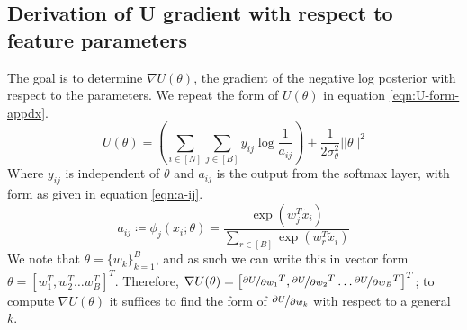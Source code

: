 \subsection{Derivation of U gradient with respect to feature parameters}
\label{appdx:gradu}
The goal is to determine $\nabla U(\theta)$, the gradient of the negative log posterior with respect to the parameters. We repeat the form of $U(\theta)$ in equation \ref{eqn:U-form-appdx}.
%
\begin{equation}
	U(\theta) = \left( \sum_{i \in [N]} \sum_{j \in [B]} y_{ij} \log \frac{1}{a_{ij}} \right)
	+ \frac{1}{2\sigma_\theta^2} ||\theta||^2
	\label{eqn:U-form-appdx}
\end{equation}
%
Where $y_{ij}$ is independent of $\theta$ and $a_{ij}$ is the output from the softmax layer, with form as given in equation \ref{eqn:a-ij}.
%
\begin{equation}
	a_{ij} \coloneqq \phi_{j} (x_i; \theta) = \frac{\exp(w_j^T \tilde{x}_i)}{\sum_{r \in [B]} \exp(w_r^T \tilde{x}_i)}
	\label{eqn:a-ij} 
\end{equation}
%
We note that $\theta = \{w_k\}_{k=1}^B$, and as such we can write this in vector form $\theta = \left[w_1^T, w_2^T \dots w_B^T  \right]^T$. Therefore, $\nabla U(\theta) = \left[\nicefrac{\partial U}{\partial w_1}^T,\nicefrac{\partial U}{\partial w_2}^T \dots \nicefrac{\partial U}{\partial w_B}^T  \right]^T$; to compute $\nabla U(\theta)$ it suffices to find the form of $\nicefrac{\partial U}{\partial w_k}$ with respect to a general $k$.

